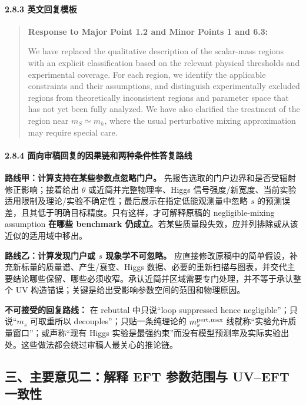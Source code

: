 \documentclass[
  chinese,
  UTF8]{ctexart}
\begin{document}
\paragraph{2.8.3
英文回复模板}\label{ux82f1ux6587ux56deux590dux6a21ux677f}

\begin{quote}
\textbf{Response to Major Point 1.2 and Minor Points 1 and 6.3:}

We have replaced the qualitative description of the scalar-mass regions
with an explicit classification based on the relevant physical
thresholds and experimental coverage. For each region, we identify the
applicable constraints and their assumptions, and distinguish
experimentally excluded regions from theoretically inconsistent regions
and parameter space that has not yet been fully analyzed. We have also
clarified the treatment of the region near \(m_S \simeq m_h\), where the
usual perturbative mixing approximation may require special care.
\end{quote}

\paragraph{2.8.4
面向审稿回复的因果链和两种条件性答复路线}\label{ux9762ux5411ux5ba1ux7a3fux56deux590dux7684ux56e0ux679cux94feux548cux4e24ux79cdux6761ux4ef6ux6027ux7b54ux590dux8defux7ebf}

\textbf{路线甲：计算支持在某些参数点忽略门户。}
先报告选取的门户边界和是否受辐射修正影响；接着给出 \(\theta\)
或近简并完整物理率、Higgs
信号强度/新宽度、当前实验适用限制及理论/实验不确定性；最后展示在指定低能观测量中忽略
\(s\) 的预测误差，且其低于明确目标精度。只有这样，才可解释原稿的
negligible-mixing assumption \textbf{在哪些 benchmark
仍成立}。若某些质量段失效，应并列排除或从该近似的适用域中移出。

\textbf{路线乙：计算发现门户或 \(s\) 现象学不可忽略。}
应直接修改原稿中的简单假设，补充新标量的质量谱、产生/衰变、Higgs
数据、必要的重新扫描与图表，并交代主要结论哪些保留、哪些必须收窄。承认近简并区域需要专门处理，并不等于承认整个
UV 构造错误；关键是给出受影响参数空间的范围和物理原因。

\textbf{不可接受的回复路线：} 在 rebuttal 中只说``loop suppressed hence
negligible''；只说``\(m_s\) 可取重所以 decouples''；只贴一条纯理论的
\(m_s^{\rm pert,max}\) 线就称``实验允许质量窗口''；或声称``现有 Higgs
实验是最强约束''而没有模型预测率及实际实验出处。这些做法都会绕过审稿人最关心的推论链。

\subsection{三、主要意见二：解释 EFT 参数范围与 UV--EFT
一致性}\label{major-2}
\end{document}
